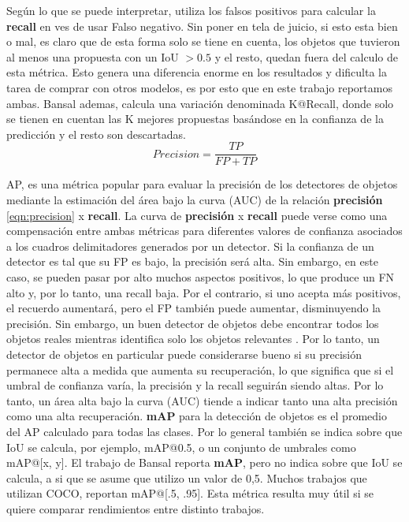Según lo que se puede interpretar, utiliza los falsos positivos para calcular la \textbf{recall} en ves de usar Falso negativo. Sin poner en tela de juicio, si esto esta bien o mal, es claro que de esta forma solo se tiene en cuenta, los objetos que tuvieron al menos una propuesta con un IoU $> 0.5$ y el resto, quedan fuera del calculo de esta métrica. Esto genera una diferencia enorme en los resultados y dificulta la tarea de comprar con otros modelos, es  por esto que en este trabajo reportamos ambas. Bansal ademas, calcula una variación denominada K@Recall, donde solo se tienen en cuentan las K mejores propuestas basándose en la confianza de la predicción y el resto son descartadas.\\

\begin{equation} 
	\label{eqn:precision}
	Precision =\frac{TP}{FP+TP}
\end{equation}

AP, es una métrica popular para evaluar la precisión de los detectores de objetos mediante la estimación del área bajo la curva (AUC) de la relación \textbf{precisión} \ref{eqn:precision} x \textbf{recall}. La curva de \textbf{precisión} x \textbf{recall} puede verse como una compensación entre ambas métricas para diferentes valores de confianza asociados a los cuadros delimitadores generados por un detector. Si la confianza de un detector es tal que su FP es bajo, la precisión será alta. Sin embargo, en este caso, se pueden pasar por alto muchos aspectos positivos, lo que produce un FN alto y, por lo tanto, una recall baja. Por el contrario, si uno acepta más positivos, el recuerdo aumentará, pero el FP también puede aumentar, disminuyendo la precisión. Sin embargo, un buen detector de objetos debe encontrar todos los objetos reales  mientras identifica solo los objetos relevantes . Por lo tanto, un detector de objetos en particular puede considerarse bueno si su precisión permanece alta a medida que aumenta su recuperación, lo que significa que si el umbral de confianza varía, la precisión y la recall seguirán siendo altas. Por lo tanto, un área alta bajo la curva (AUC) tiende a indicar tanto una alta precisión como una alta recuperación. \textbf{mAP} para la detección de objetos es el promedio del AP calculado para todas las clases. Por lo general también se indica sobre que IoU se calcula, por ejemplo, mAP@0.5, o un conjunto de umbrales como mAP@[x, y]. El trabajo de Bansal reporta \textbf{mAP}, pero no indica sobre que IoU se calcula, a si que se asume que utilizo un valor de 0,5. Muchos trabajos que utilizan COCO, reportan mAP@[.5, .95]. Esta métrica resulta muy útil si se quiere comparar rendimientos entre distinto trabajos.


